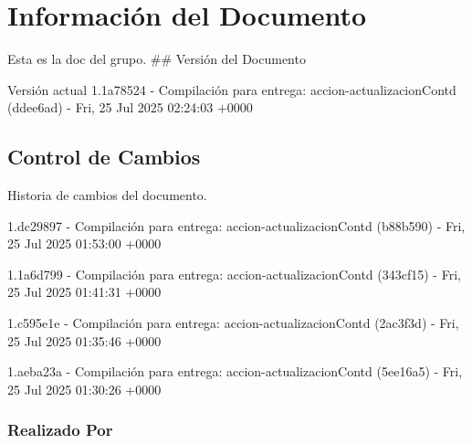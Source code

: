 \documentclass[
	a4paper, %
	12pt, %
]{include/CSSullivanBusinessReport}
\begin{document}
\newpage

\begin{twothirdswidth} %
	\tableofcontents %
\end{twothirdswidth}

\newpage


\newpage

\section{Información del
Documento}\label{sec:informaciuxf3n-del-documento}

Esta es la doc del grupo. \#\# Versión del Documento

\begin{quote}
\end{quote}

Versión actual 1.1a78524 - Compilación para entrega:
accion-actualizacionContd (ddee6ad) - Fri, 25 Jul 2025 02:24:03 +0000

\subsection{Control de Cambios}\label{sec:control-de-cambios}

Historia de cambios del documento.

1.dc29897 - Compilación para entrega: accion-actualizacionContd
(b88b590) - Fri, 25 Jul 2025 01:53:00 +0000

1.1a6d799 - Compilación para entrega: accion-actualizacionContd
(343cf15) - Fri, 25 Jul 2025 01:41:31 +0000

1.c595e1e - Compilación para entrega: accion-actualizacionContd
(2ac3f3d) - Fri, 25 Jul 2025 01:35:46 +0000

1.aeba23a - Compilación para entrega: accion-actualizacionContd
(5ee16a5) - Fri, 25 Jul 2025 01:30:26 +0000

\subsubsection{Realizado Por}\label{sec:realizado-por}
\end{document}
